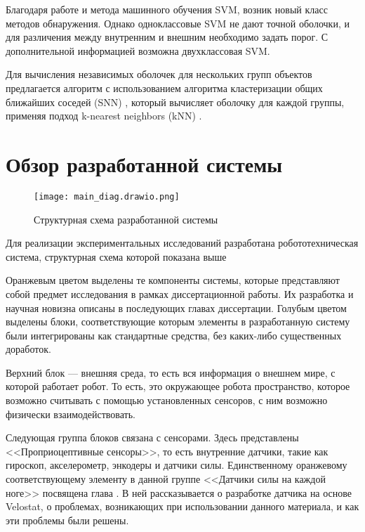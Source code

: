 Благодаря работе \cite{j.a.leonardUsingRadialBasis1992} и  метода машинного обучения  SVM, возник новый класс методов обнаружения. Однако одноклассовые SVM не дают точной оболочки, и для различения между внутренним и внешним необходимо задать порог. С дополнительной информацией возможна двухклассовая SVM. 

Для вычисления независимых оболочек для нескольких групп объектов предлагается алгоритм с использованием алгоритма кластеризации общих ближайших соседей (SNN) , который вычисляет оболочку для каждой группы, применяя подход k-nearest neighbors (kNN) \cite{moreiraConcaveHullKnearest2007,ertozNewSharedNearest2002,chauBorderSamplesDetection2011,xiaBORDEREfficientComputation2006}.

\section{Обзор разработанной системы}
\begin{figure}[H]
    \centering\texttt{[image: main\_diag.drawio.png]}
    \caption{Структурная схема разработанной системы}
    \label{fig:diag_system.png}
\end{figure}

Для реализации экспериментальных исследований разработана робототехническая система, структурная схема которой показана выше 

Оранжевым цветом выделены те компоненты системы, которые представляют собой предмет исследования в рамках диссертационной работы. Их разработка и научная новизна описаны в последующих главах диссертации. Голубым цветом выделены блоки, соответствующие которым элементы в разработанную систему были интегрированы как стандартные средства,   без каких-либо существенных доработок.

Верхний блок --- внешняя среда, то есть вся информация о внешнем мире, с которой работает робот. То есть, это окружающее робота пространство, которое возможно считывать с помощью установленных сенсоров, с ним возможно физически взаимодействовать.

Следующая группа блоков связана с сенсорами. Здесь представлены <<Проприоцептивные сенсоры>>, то есть внутренние датчики, такие как гироскоп, акселерометр, энкодеры и датчики силы. Единственному оранжевому соответствующему элементу в данной группе <<Датчики силы на каждой ноге>> посвящена глава . В ней рассказывается о разработке датчика на основе Velostat, о проблемах, возникающих при использовании данного материала, и как эти проблемы были решены.

